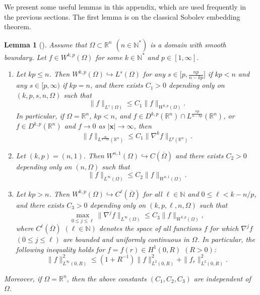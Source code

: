 \documentclass[11pt,reqno]{amsart}
\newtheorem{lem}{Lemma}[section]
\numberwithin{rk}{section}
\numberwithin{prop}{section}
\numberwithin{mydef}{section}
\numberwithin{lem}{section}
\numberwithin{equation}{section}
\numberwithin{thm}{section}
\begin{document}
We present some useful lemmas in this appendix, which are used frequently in the previous sections. The first lemma is on the classical  Sobolev embedding theorem.  

\begin{lem}[\cite{af,CZZ1}]\label{ale1}
Assume that $\Omega \subset \mathbb{R}^n$ $(n\in \mathbb{N}^*)$ is a domain with smooth boundary. Let  $f\in W^{k,p}(\Omega)$ for some $k\in \mathbb{N}^*$ and $p\in [1,\infty]$. 
\begin{enumerate}
\item[$\mathrm{(i)}$] 
Let $kp\leq n$. Then $W^{k,p}(\Omega)\hookrightarrow L^s(\Omega)$ for any $s\in\big[p,\frac{np}{n-kp}\big]$ if $kp<n$ and any $s\in[p,\infty)$ if $kp=n$, and there exists  $C_1>0$ depending only on $(k,p,s,n,\Omega)$ such that 
\begin{equation*}
\|f\|_{L^s(\Omega)}\leq C_1\|f\|_{W^{k,p}(\Omega)}.
\end{equation*}
In particular, if $\Omega=\mathbb{R}^n$, $kp<n$, and $f\in D^{k,p}(\mathbb{R}^n)\cap L^{\frac{np}{n-kp}}(\mathbb{R}^n)$, or $f\in D^{k,p}(\mathbb{R}^n)$  and $f\to 0$ as $|\boldsymbol{x}|\to \infty$, then 
\begin{equation*} 
\|f\|_{L^{\frac{np}{n-kp}}(\mathbb{R}^n)}\leq C_1\|\nabla^k f\|_{L^p(\mathbb{R}^n)}.
\end{equation*}
\item[$\mathrm{(ii)}$] 
Let $(k,p)=(n,1)$. Then $W^{n,1}(\Omega)\hookrightarrow C(\overline{\Omega})$ and  there exists $C_2>0$ depending only on $(n,\Omega)$ such that
\begin{equation*}
\|f\|_{L^\infty(\Omega)}\leq C_2\|f\|_{W^{n,1}(\Omega)}. 
\end{equation*}
\item[$\mathrm{(iii)}$] 
Let $kp>n$. Then $W^{k,p}(\Omega)\hookrightarrow C^\ell(\overline\Omega)$ for all $\ell\in \mathbb{N}$ and $0\leq \ell<k-n/p$,  and  there exists $C_3>0$ depending only on $(k,p,\ell,n,\Omega)$ such that
\begin{equation*}
\max_{0\leq j\leq \ell}\|\nabla ^j f\|_{L^\infty(\Omega)}\leq C_3\|f\|_{W^{k,p}(\Omega)}, 
\end{equation*}
where $C^\ell(\overline\Omega)$ $(\ell\in \mathbb{N})$ denotes the space of all functions $f$ for which $\nabla^j f$ $(0\leq j\leq \ell)$ are bounded and uniformly continuous in $\Omega$.  In particular, the following inequality holds for $f=f(r)\in H^1(0,R)$ $(R>0)${\rm :}
\begin{equation*} 
\|f\|_{L^\infty(0,R)}^2 \leq (1+R^{-1})\|f\|_{L^2(0,R)}^2+\|f_r\|_{L^2(0,R)}^2.
\end{equation*}
\end{enumerate}
Moreover, if $\Omega=\mathbb{R}^n$, then the above constants $(C_1,C_2,C_3)$ are independent of $\Omega$.
\end{lem} 
 
\end{document}
